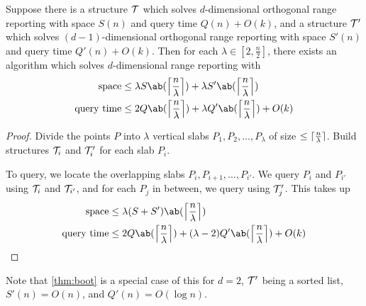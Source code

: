 \begin{lemma}[Bootstrapping]
    Suppose there is a structure $\mathcal{T}$ which solves $d$-dimensional
    orthogonal range reporting with space $S(n)$ and query time
    $Q(n) + O(k)$,
    and a structure $\mathcal{T}'$ which solves $(d-1)$-dimensional orthogonal
    range reporting with space $S'(n)$ and query time $Q'(n) + O(k)$.
    Then for each $\lambda \in [2, \frac n2]$,
    there exists an algorithm which solves $d$-dimensional
    range reporting with \begin{align*}
        \text{space} &\le \lambda S\ab(\ceil*{\frac n\lambda})
            + \lambda S'\ab(\ceil*{\frac n\lambda}) \\
        \text{query time} &\le 2 Q\ab(\ceil*{\frac n\lambda})
            + \lambda Q'\ab(\ceil*{\frac n\lambda}) + O(k)
    \end{align*}
\end{lemma}
\begin{proof}
    Divide the points $P$ into $\lambda$ vertical slabs
    $P_1, P_2, \dots, P_\lambda$ of size $\le \lceil\frac n\lambda\rceil$.
    Build structures $\mathcal{T}_i$ and $\mathcal{T}'_i$ for each slab $P_i$.

    To query, we locate the overlapping slabs $P_i, P_{i+1}, \dots, P_{i'}$.
    We query $P_i$ and $P_{i'}$ using $\mathcal{T}_i$ and $\mathcal{T}_{i'}$,
    and for each $P_j$ in between, we query using $\mathcal{T}'_j$.
    This takes up \begin{align*}
        \text{space} &\le \lambda (S + S')\ab(\ceil*{\frac n\lambda}) \\
        \text{query time} &\le 2 Q\ab(\ceil*{\frac n\lambda})
            + (\lambda - 2) Q'\ab(\ceil*{\frac n\lambda}) + O(k)
            \qedhere
    \end{align*}
\end{proof}
Note that \cref{thm:boot} is a special case of this for
$d = 2$,
$\mathcal{T}'$ being a sorted list,
$S'(n) = O(n)$, and
$Q'(n) = O(\log n)$.

